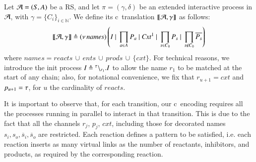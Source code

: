 \begin{definition}[Translation]
\label{def:trans}
Let ${\cal A} = (S, A)$ be a RS, and let $\pi=(\gamma,\delta)$ be an extended interactive process in ${\cal A}$, with  $\gamma=\{C_i\}_{i\in\mathbb{N}}$. 
We define its c\CNA~translation $\llbracket{\cal A},\gamma \rrbracket$ as follows: 
$$
\llbracket{\cal A},\gamma \rrbracket 
\triangleq
 (\nu\, \mathit{names})\left(I ~|~ \prod_{a\in A} P_a ~|~  \mathit{Cxt}^1 ~|~\prod_{s\in C_0}P_{s} ~|~ \prod_{s \notin C_0}\overline{P_s}\right)
$$
where $\mathit{names} = \mathit{reacts}\, \cup\, \mathit{ents}\, \cup \, \mathit{prods}\, \cup\, \{cxt\}$. 
For technical reasons, we introduce the init process $I \triangleq {}^{\tau} \backslash_{r_1}.I$
to allow the name $r_1$ to be matched at the start of any chain; also, 
for notational convenience, we fix that 
$r_{u+1} = \mathit{cxt}$ and $p_{u+1}=\tau$,  for $u$ the cardinality of $\mathit{reacts}$.
\end{definition}
 



It is important to observe that,   for each transition, our c\CNA \ encoding requires  all the processes 
running in parallel to  interact in that transition.
This is due to the fact that  all the channels $r_j$, $p_j$, $\mathit{cxt}$, including those for decorated names $s_{i},s_{o},\overline{s}_i,\overline{s}_o$ are  restricted.
Each reaction defines a pattern to be satisfied, i.e. each reaction inserts as many virtual links  as  the number of reactants, inhibitors, and products, as required by the corresponding reaction.

